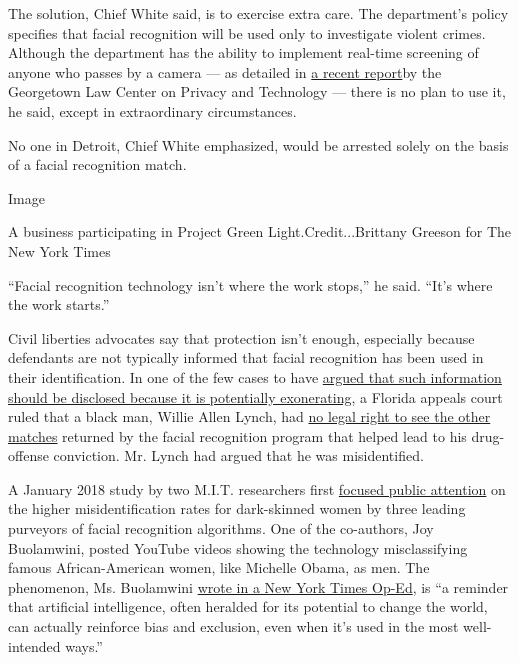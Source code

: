 The solution, Chief White said, is to exercise extra care. The
department's policy specifies that facial recognition will be used only
to investigate violent crimes. Although the department has the ability
to implement real-time screening of anyone who passes by a camera --- as
detailed in \href{https://www.americaunderwatch.com/}{a recent report}by
the Georgetown Law Center on Privacy and Technology --- there is no plan
to use it, he said, except in extraordinary circumstances.

No one in Detroit, Chief White emphasized, would be arrested solely on
the basis of a facial recognition match.

Image

A business participating in Project Green Light.Credit...Brittany
Greeson for The New York Times

``Facial recognition technology isn't where the work stops,'' he said.
``It's where the work starts.''

Civil liberties advocates say that protection isn't enough, especially
because defendants are not typically informed that facial recognition
has been used in their identification. In one of the few cases to have
\href{https://www.jacksonville.com/public-safety/2016-11-11/how-accused-drug-dealer-revealed-jso-s-facial-recognition-network}{argued
that such information should be disclosed because it is potentially
exonerating}, a Florida appeals court ruled that a black man, Willie
Allen Lynch, had
\href{https://www.jacksonville.com/news/20190123/florida-court-prosecutors-had-no-obligation-to-turn-over-facial-recognition-evidence}{no
legal right to see the other matches} returned by the facial recognition
program that helped lead to his drug-offense conviction. Mr. Lynch had
argued that he was misidentified.

A January 2018 study by two M.I.T. researchers first
\href{https://www.nytimes3xbfgragh.onion/2018/02/09/technology/facial-recognition-race-artificial-intelligence.html}{focused
public attention} on the higher misidentification rates for dark-skinned
women by three leading purveyors of facial recognition algorithms. One
of the co-authors, Joy Buolamwini, posted YouTube videos showing the
technology misclassifying famous African-American women, like Michelle
Obama, as men. The phenomenon, Ms. Buolamwini
\href{https://www.nytimes3xbfgragh.onion/2018/06/21/opinion/facial-analysis-technology-bias.html}{wrote
in a New York Times Op-Ed}, is ``a reminder that artificial
intelligence, often heralded for its potential to change the world, can
actually reinforce bias and exclusion, even when it's used in the most
well-intended ways.''

